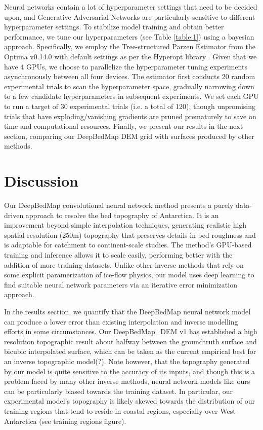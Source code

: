 \documentclass[tc, manuscript]{copernicus}
\begin{document}
Neural networks contain a lot of hyperparameter settings that need to be decided upon, and Generative Adversarial Networks are particularly sensitive to different hyperparameter settings.
To stabilize model training and obtain better performance, we tune our hyperparameters (see Table \ref{table:1}) using a bayesian approach.
Specifically, we employ the Tree-structured Parzen Estimator \citep{BergstraAlgorithmsHyperparameterOptimization2011} from the Optuna v0.14.0 \citep{AkibaOptunaNextgenerationHyperparameter2019} with default settings as per the Hyperopt library \citep{BergstraHyperoptPythonlibrary2015}.
Given that we have 4 GPUs, we choose to parallelize the hyperparameter tuning experiments asynchronously between all four devices.
The estimator first conducts 20 random experimental trials to scan the hyperparameter space, gradually narrowing down to a few candidate hyperparameters in subsequent experiments.
We set each GPU to run a target of 30 experimental trials (i.e. a total of 120), though unpromising trials that have exploding/vanishing gradients are pruned prematurely to save on time and computational resources.
Finally, we present our results in the next section, comparing our DeepBedMap DEM grid with surfaces produced by other methods.


\section{Discussion}

Our DeepBedMap convolutional neural network method presents a purely data-driven approach to resolve the bed topography of Antarctica.
It is an improvement beyond simple interpolation techniques, generating realistic high spatial resolution (250m) topography that preserves details in bed roughness and is adaptable for catchment to continent-scale studies.
The method's GPU-based training and inference allows it to scale easily, performing better with the addition of more training datasets.
Unlike other inverse methods that rely on some explicit paramerization of ice-flow physics, our model uses deep learning to find suitable neural network parameters via an iterative error minimization approach.

In the results section, we quantify that the DeepBedMap neural network model can produce a lower error than existing interpolation and inverse modelling efforts in some circumstances.
Our DeepBedMap\_DEM v1 has established a high resolution topographic result about halfway between the groundtruth surface and bicubic interpolated surface, which can be taken as the current empirical best for an inverse topographic model(?).
Note however, that the topography generated by our model is quite sensitive to the accuracy of its inputs, and though this is a problem faced by many other inverse methods, neural network models like ours can be particularly biased towards the training dataset.
In particular, our experimental model's topography is likely skewed towards the distribution of our training regions that tend to reside in coastal regions, especially over West Antarctica (see training regions figure).
\end{document}
